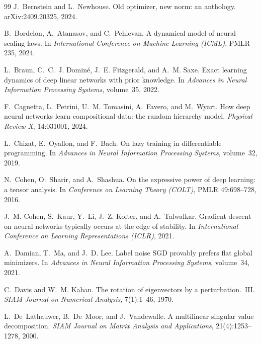 \documentclass[11pt]{article}
\theoremstyle{definition}
\numberwithin{equation}{section}
\begin{document}
\begin{thebibliography}{99}
J.~Bernstein and L.~Newhouse.
\newblock Old optimizer, new norm: an anthology.
\newblock arXiv:2409.20325, 2024.

B.~Bordelon, A.~Atanasov, and C.~Pehlevan.
\newblock A dynamical model of neural scaling laws.
\newblock In \emph{International Conference on Machine Learning (ICML)}, PMLR 235, 2024.

L.~Braun, C.~C.~J. Domin\'e, J.~E. Fitzgerald, and A.~M. Saxe.
\newblock Exact learning dynamics of deep linear networks with prior knowledge.
\newblock In \emph{Advances in Neural Information Processing Systems}, volume~35, 2022.

F.~Cagnetta, L.~Petrini, U.~M. Tomasini, A.~Favero, and M.~Wyart.
\newblock How deep neural networks learn compositional data: the random hierarchy model.
\newblock \emph{Physical Review X}, 14:031001, 2024.

L.~Chizat, E.~Oyallon, and F.~Bach.
\newblock On lazy training in differentiable programming.
\newblock In \emph{Advances in Neural Information Processing Systems}, volume~32, 2019.

N.~Cohen, O.~Sharir, and A.~Shashua.
\newblock On the expressive power of deep learning: a tensor analysis.
\newblock In \emph{Conference on Learning Theory (COLT)}, PMLR 49:698--728, 2016.

J.~M. Cohen, S.~Kaur, Y.~Li, J.~Z. Kolter, and A.~Talwalkar.
\newblock Gradient descent on neural networks typically occurs at the edge of stability.
\newblock In \emph{International Conference on Learning Representations (ICLR)}, 2021.

A.~Damian, T.~Ma, and J.~D. Lee.
\newblock Label noise {SGD} provably prefers flat global minimizers.
\newblock In \emph{Advances in Neural Information Processing Systems}, volume~34, 2021.

C.~Davis and W.~M. Kahan.
\newblock The rotation of eigenvectors by a perturbation.~{III}.
\newblock \emph{SIAM Journal on Numerical Analysis}, 7(1):1--46, 1970.

L.~De~Lathauwer, B.~De~Moor, and J.~Vandewalle.
\newblock A multilinear singular value decomposition.
\newblock \emph{SIAM Journal on Matrix Analysis and Applications}, 21(4):1253--1278, 2000.


\end{thebibliography}
\end{document}
